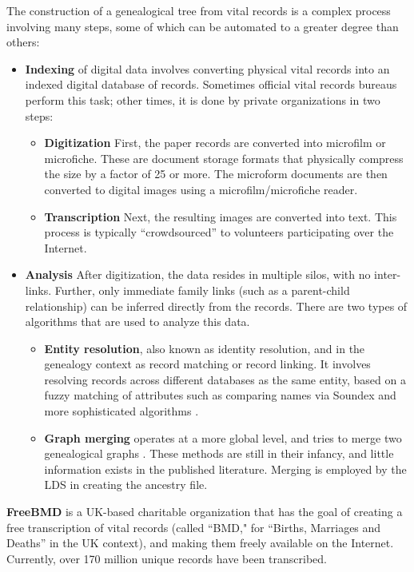 \documentclass{article}
\begin{document}
The construction of a genealogical tree from vital records is a complex process involving many steps, some of which can be automated to a greater degree than others:
\begin{itemize}
\item {\bf Indexing} of digital data involves converting physical vital records into an indexed digital database of records. Sometimes official vital records bureaus perform this task; other times, it is done by private organizations in two steps:
\begin{itemize}
\item {\bf Digitization} First, the paper records are converted into microfilm or microfiche. These are document storage formats that physically compress the size by a factor of 25 or more.\cite{wikipedia}  The microform documents are then converted to digital images using a microfilm/microfiche reader. 
\item {\bf Transcription} Next, the resulting images are converted into text. This process is  typically ``crowdsourced'' to volunteers participating over the Internet.
\end{itemize}
\item {\bf Analysis} After digitization, the data resides in multiple silos, with no inter-links. Further, only immediate family links (such as a parent-child relationship) can be inferred directly from the records. There are two types of algorithms that are used to analyze this data.
\begin{itemize}
\item {\bf Entity resolution}, also known as identity resolution, and in the genealogy context as record matching or record linking. It involves resolving records across different databases as the same entity, based on a fuzzy matching of attributes such as comparing names via Soundex and more sophisticated algorithms \cite{Lait_and_Randall_An_Assessment_of_Name_Matching_Algorithms}.
\item {\bf Graph merging} operates at a more global level, and tries to merge two genealogical graphs \cite{wilson-merge}. These methods are still in their infancy, and little information exists in the published literature. Merging is employed by the LDS in creating the ancestry file.  
\end{itemize}

\end{itemize}

{\bf FreeBMD} is a UK-based charitable organization that has the goal of creating a free transcription of vital records (called ``BMD," for ``Births, Marriages and Deaths'' in the UK context), and making them freely available on the Internet.  Currently, over 170 million unique records have been transcribed.
\end{document}
